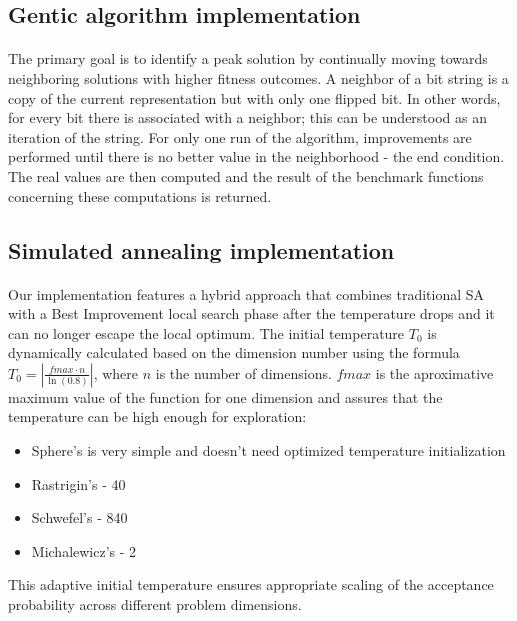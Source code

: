 \documentclass{article}
\begin{document}
\subsection{Gentic algorithm implementation}

\paragraph{}
The primary goal is to identify a peak solution by continually moving towards neighboring solutions with higher fitness outcomes. A neighbor of a bit string is a copy of the current representation but with only one flipped bit. In other words, for every bit there is associated with a neighbor; this can be understood as an iteration of the string. For only one run of the algorithm, improvements are performed until there is no better value in the neighborhood - the end condition. The real values are then computed and the result of the benchmark functions concerning these computations is returned.

\subsection{Simulated annealing implementation}

\paragraph{}
Our implementation features a hybrid approach that combines traditional SA with a Best Improvement local search phase after the temperature drops and it can no longer escape the local optimum. The initial temperature $T_0$ is dynamically calculated based on the dimension number using the formula $T_0 = \left|\frac{fmax \cdot n}{\ln(0.8)}\right|$, where $n$ is the number of dimensions. $fmax$ is the aproximative maximum value of the function for one dimension and assures that the temperature can be high enough for exploration:
\begin{itemize} 
    \item Sphere's is very simple and doesn't need optimized temperature initialization
    \item Rastrigin's - 40 
    \item Schwefel's - 840 
    \item Michalewicz's - 2 
\end{itemize} 
This adaptive initial temperature ensures appropriate scaling of the acceptance probability across different problem dimensions. 
\end{document}

